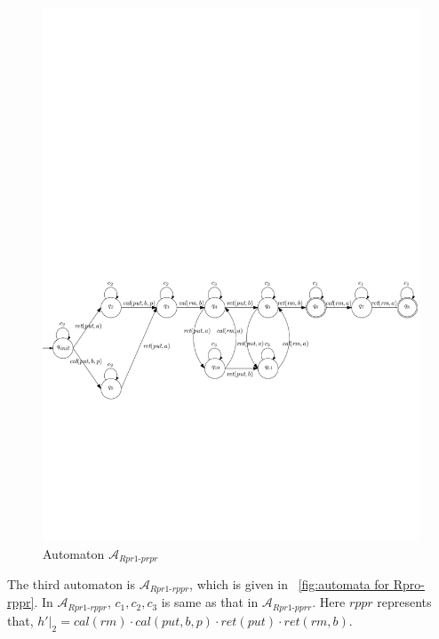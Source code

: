 \begin{figure}[htbp]
  \centering
  \includegraphics[width=1 \textwidth]{PIC_AUTO_UNMATCHED_Rpr1-prpr.pdf}
  \caption{Automaton $\mathcal{A}_{\textit{Rpr1-prpr}}$}
  \label{fig:automata for Rpro-prpr}
\end{figure}



The third automaton is $\mathcal{A}_{\textit{Rpr1-rppr}}$, which is given in \figurename~\ref{fig:automata for Rpro-rppr}. In $\mathcal{A}_{\textit{Rpr1-rppr}}$, $c_1, c_2, c_3$ is same as that in $\mathcal{A}_{\textit{Rpr1-pprr}}$. Here $\textit{rppr}$ represents that, $h' \vert_{2} = \textit{cal}(\textit{rm}) \cdot \textit{cal}(\textit{put},b,p) \cdot \textit{ret}(\textit{put}) \cdot \textit{ret}(\textit{rm},b)$.

